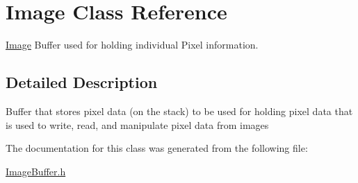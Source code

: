 \hypertarget{classImage}{}\section{Image Class Reference}
\label{classImage}


\hyperlink{classImage}{Image} Buffer used for holding individual Pixel information.  




\subsection{Detailed Description}

\begin{DoxyItemize}
\item Buffer that stores pixel data (on the stack) to be used for holding pixel data that is used to write, read, and manipulate pixel data from images 
\end{DoxyItemize}

The documentation for this class was generated from the following file\+:\begin{DoxyCompactItemize}
\item 
\hyperlink{ImageBuffer_8h}{Image\+Buffer.\+h}\end{DoxyCompactItemize}
